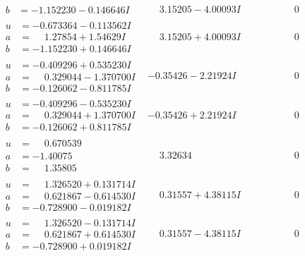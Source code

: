 \documentclass[1p]{elsarticle_modified}
\theoremstyle{definition}
\begin{document}
$$\begin{array}{c|c|c}
\begin{aligned}
b &= -1.152230 - 0.146646 I\end{aligned}
 & \phantom{-}3.15205 - 4.00093 I & \phantom{-0.000000 } 0 \\ \hline\begin{aligned}
u &= -0.673364 - 0.113562 I \\
a &= \phantom{-}1.27854 + 1.54629 I \\
b &= -1.152230 + 0.146646 I\end{aligned}
 & \phantom{-}3.15205 + 4.00093 I & \phantom{-0.000000 } 0 \\ \hline\begin{aligned}
u &= -0.409296 + 0.535230 I \\
a &= \phantom{-}0.329044 - 1.370700 I \\
b &= -0.126062 - 0.811785 I\end{aligned}
 & -0.35426 - 2.21924 I & \phantom{-0.000000 } 0 \\ \hline\begin{aligned}
u &= -0.409296 - 0.535230 I \\
a &= \phantom{-}0.329044 + 1.370700 I \\
b &= -0.126062 + 0.811785 I\end{aligned}
 & -0.35426 + 2.21924 I & \phantom{-0.000000 } 0 \\ \hline\begin{aligned}
u &= \phantom{-}0.670539\phantom{ +0.000000I} \\
a &= -1.40075\phantom{ +0.000000I} \\
b &= \phantom{-}1.35805\phantom{ +0.000000I}\end{aligned}
 & \phantom{-}3.32634\phantom{ +0.000000I} & \phantom{-0.000000 } 0 \\ \hline\begin{aligned}
u &= \phantom{-}1.326520 + 0.131714 I \\
a &= \phantom{-}0.621867 - 0.614530 I \\
b &= -0.728900 - 0.019182 I\end{aligned}
 & \phantom{-}0.31557 + 4.38115 I & \phantom{-0.000000 } 0 \\ \hline\begin{aligned}
u &= \phantom{-}1.326520 - 0.131714 I \\
a &= \phantom{-}0.621867 + 0.614530 I \\
b &= -0.728900 + 0.019182 I\end{aligned}
 & \phantom{-}0.31557 - 4.38115 I & \phantom{-0.000000 } 0 \\ \hline\begin{aligned}

\end{aligned}
\end{array}$$
\end{document}
